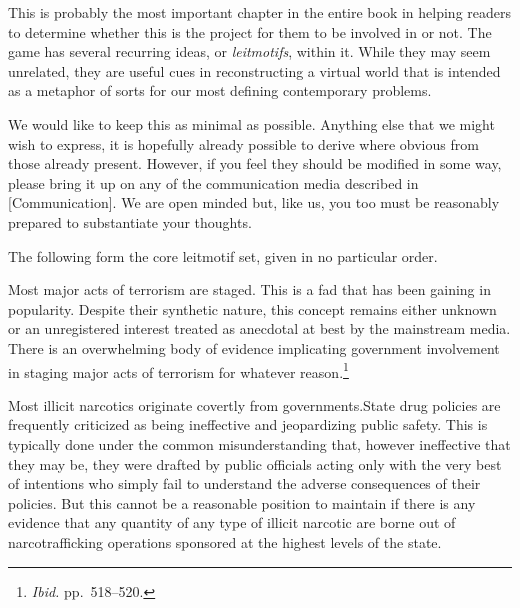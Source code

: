 

This is probably the most important chapter in the entire book in helping readers to determine whether this is the project for them to be involved in or not. The game has several recurring ideas, or {\it leitmotifs}, within it. While they may seem unrelated, they are useful cues in reconstructing a virtual world that is intended as a metaphor of sorts for our most defining contemporary problems.

We would like to keep this  as minimal as possible. Anything else that we might wish to express, it is hopefully already possible to derive where obvious from those already present. However, if you feel they should be modified in some way, please bring it up on any of the communication media described in [Communication]. We are open minded but, like us, you too must be reasonably prepared to substantiate your thoughts.

The following form the core leitmotif set, given in no particular order. 

\startitemize[4]

Most major acts of terrorism are staged. This is a fad that has been gaining in popularity. Despite their synthetic nature, this concept remains either unknown or an unregistered interest treated as anecdotal at best by the mainstream media. There is an overwhelming body of evidence implicating government involvement in staging major acts of terrorism for whatever reason.\footnotecite[extras={ p.~193.}][shirer1960]\footnote{{\it Ibid.} pp.~518--520.}\footnotecite[harrit2009]\footnotecite[northwoods]\footnotecite[king2010]\footnotecite[chossudovsky2005]


Most illicit narcotics originate covertly from governments. State drug policies are frequently criticized as being ineffective and jeopardizing public safety. This is typically done under the common misunderstanding that, however ineffective that they may be, they were drafted by public officials acting only with the very best of intentions who simply fail to understand the adverse consequences of their policies. But this cannot be a reasonable position to maintain if there is any evidence that any quantity of any type of illicit narcotic are borne out of narcotrafficking operations sponsored at the highest levels of the state.


